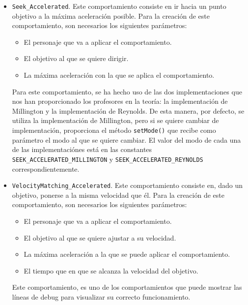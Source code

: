 \begin{itemize}
 \begin{itemize}
 	\item
 \end{itemize} 
 \item \texttt{Seek\_Accelerated}. Este comportamiento consiste en ir hacia un punto objetivo a la máxima aceleración posible. Para la creación de este comportamiento, son necesarios los siguientes parámetros:
 \begin{itemize}
  \item El personaje que va a aplicar el comportamiento.
  \item El objetivo al que se quiere dirigir.
  \item La máxima aceleración con la que se aplica el comportamiento.
 \end{itemize}
 Para este comportamiento, se ha hecho uso de las dos implementaciones que nos han proporcionado los profesores en la teoría: la implementación de Millington y la implementación de Reynolds. De esta manera, por defecto, se utiliza la implementación de Millington, pero si se quiere cambiar de implementación, proporciona el método \texttt{setMode()} que recibe como parámetro el modo al que se quiere cambiar. El valor del modo de cada una de las implementaciónes está en las constantes \texttt{SEEK\_ACCELERATED\_MILLINGTON} y \texttt{SEEK\_ACCELERATED\_REYNOLDS} correspondientemente.
 
 
 \item \texttt{VelocityMatching\_Accelerated}. Este comportamiento consiste en, dado un objetivo, ponerse a la misma velocidad que él. Para la creación de este comportamiento, son necesarios los siguientes parámetros:
 \begin{itemize}
  \item El personaje que va a aplicar el comportamiento.
  \item El objetivo al que se quiere ajustar a su velocidad.
  \item La máxima aceleración a la que se puede aplicar el comportamiento.
  \item El tiempo que en que se alcanza la velocidad del objetivo.
 \end{itemize}
 Este comportamiento, es uno de los comportamientos que puede mostrar las líneas de debug para visualizar su correcto funcionamiento. 
\end{itemize}

\medskip
